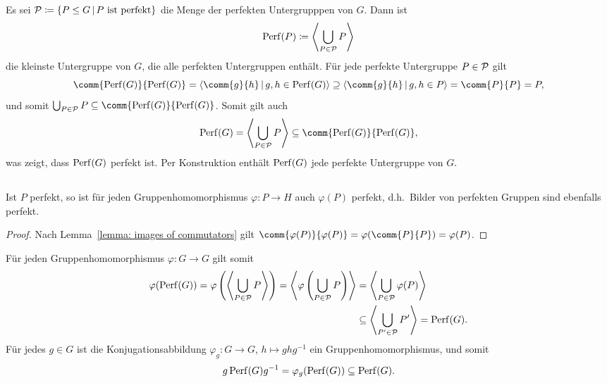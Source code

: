Es sei $\perfects \coloneqq \{P \subgroup G \suchthat \text{$P$ ist perfekt}\}$ die Menge der perfekten Untergrupppen von $G$.
Dann ist
\[
            \Perf{P}
  \coloneqq \generated*{ \bigcup_{P \in \perfects} P }
\]
die kleinste Untergruppe von $G$, die alle perfekten Untergruppen enthält.
Für jede perfekte Untergruppe $P \in \perfects$ gilt
\[
            \comm{\Perf{G}}{\Perf{G}}
  =         \generated{ \comm{g}{h} \suchthat g, h \in \Perf{G} }
  \supseteq \generated{ \comm{g}{h} \suchthat g, h \in P }
  =         \comm{P}{P}
  =         P,
\]
und somit $\bigcup_{P \in \perfects} P \subseteq \comm{\Perf{G}}{\Perf{G}}$.
Somit gilt auch
\[
            \Perf{G}
  =         \generated*{ \bigcup_{P \in \perfects} P }
  \subseteq \comm{\Perf{G}}{\Perf{G}},
\]
was zeigt, dass $\Perf{G}$ perfekt ist.
Per Konstruktion enthält $\Perf{G}$ jede perfekte Untergruppe von $G$.





\subsection{}

\begin{lemma}
  Ist $P$ perfekt, so ist für jeden Gruppenhomomorphismus $\varphi \colon P \to H$ auch $\varphi(P)$ perfekt, d.h.\ Bilder von perfekten Gruppen sind ebenfalls perfekt.
\end{lemma}

\begin{proof}
  Nach Lemma~\ref{lemma: images of commutators} gilt $\comm{ \varphi(P) }{ \varphi(P) } = \varphi( \comm{P}{P} ) = \varphi(P)$.
\end{proof}

Für jeden Gruppenhomomorphismus $\varphi \colon G \to G$ gilt somit
\begin{align*}
              \varphi( \Perf{G} )
   =          \varphi\left( \generated*{ \bigcup_{P \in \perfects} P } \right)
   =          \generated*{ \varphi\left( \bigcup_{P \in \perfects} P \right) }
  &=          \generated*{ \bigcup_{P \in \perfects} \varphi(P) }
  \\
  &\subseteq  \generated*{ \bigcup_{P' \in \perfects} P' }
   =          \Perf{G}.
\end{align*}
Für jedes $g \in G$ ist die Konjugationsabbildung $\varphi_g \colon G \to G$, $h \mapsto ghg^{-1}$ ein Gruppenhomomorphismus, und somit
\[
            g \Perf{G} g^{-1}
  =         \varphi_g( \Perf{G} )
  \subseteq \Perf{G}.
\]

